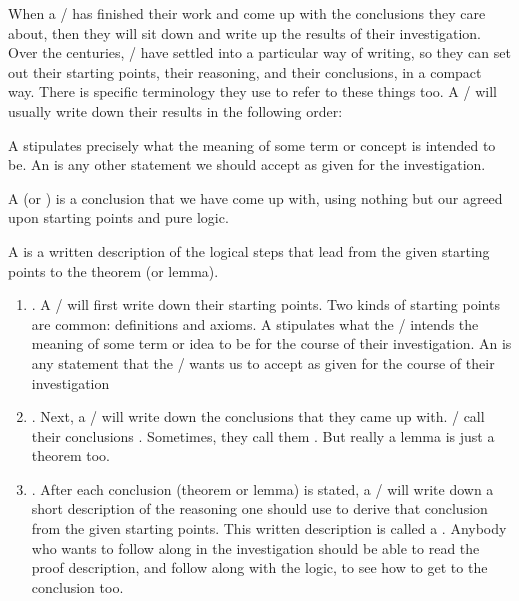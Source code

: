 \documentclass[../../../main.tex]{subfiles}
\begin{document}
When a \mather/ has finished their work and come up with the conclusions they care about, then they will sit down and write up the results of their investigation. Over the centuries, \mathers/ have settled into a particular way of writing, so they can set out their starting points, their reasoning, and their conclusions, in a compact way. There is specific terminology they use to refer to these things too. A \mather/ will usually write down their results in the following order:

\begin{terminology}
  A  stipulates precisely what the meaning of some term or concept is intended to be. An  is any other statement we should accept as given for the investigation.
\end{terminology}

\begin{terminology}
  A  (or ) is a conclusion that we have come up with, using nothing but our agreed upon starting points and pure logic.
\end{terminology}

\begin{terminology}
  A  is a written description of the logical steps that lead from the given starting points to the theorem (or lemma).
\end{terminology}

\begin{enumerate}

  \item {}. A \mather/ will first write down their starting points. Two kinds of starting points are common: definitions and axioms. A  stipulates what the \mather/ intends the meaning of some term or idea to be for the course of their investigation. An  is any statement that the \mather/ wants us to accept as given for the course of their investigation
          
  \item {}. Next, a \mather/ will write down the conclusions that they came up with. \Mathers/ call their conclusions . Sometimes, they call them . But really a lemma is just a theorem too.

  \item {}. After each conclusion (theorem or lemma) is stated, a \mather/ will write down a short description of the reasoning one should use to derive that conclusion from the given starting points. This written description is called a . Anybody who wants to follow along in the investigation should be able to read the proof description, and follow along with the logic, to see how to get to the conclusion too. 

\end{enumerate}
\end{document}
